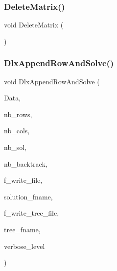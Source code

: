 \mbox{\label{_l_i_b_2_g_a_l_o_i_s_2dlx_8_c_a0d0d8367563593a49ea746e787a1a38a}} 
\subsubsection{\texorpdfstring{Delete\+Matrix()}{DeleteMatrix()}}
{\footnotesize\ttfamily void Delete\+Matrix (\begin{DoxyParamCaption}{ }\end{DoxyParamCaption})}

\mbox{\label{_l_i_b_2_g_a_l_o_i_s_2dlx_8_c_a97c7622b60d10dfea1a968ef4252e0d8}} 
\subsubsection{\texorpdfstring{Dlx\+Append\+Row\+And\+Solve()}{DlxAppendRowAndSolve()}}
{\footnotesize\ttfamily void Dlx\+Append\+Row\+And\+Solve (\begin{DoxyParamCaption}\item[{\mbox{\hyperlink{galois_8h_a09fddde158a3a20bd2dcadb609de11dc}{I\+NT}} $\ast$}]{Data,  }\item[{\mbox{\hyperlink{galois_8h_a09fddde158a3a20bd2dcadb609de11dc}{I\+NT}}}]{nb\+\_\+rows,  }\item[{\mbox{\hyperlink{galois_8h_a09fddde158a3a20bd2dcadb609de11dc}{I\+NT}}}]{nb\+\_\+cols,  }\item[{\mbox{\hyperlink{galois_8h_a09fddde158a3a20bd2dcadb609de11dc}{I\+NT}} \&}]{nb\+\_\+sol,  }\item[{\mbox{\hyperlink{galois_8h_a09fddde158a3a20bd2dcadb609de11dc}{I\+NT}} \&}]{nb\+\_\+backtrack,  }\item[{\mbox{\hyperlink{galois_8h_a09fddde158a3a20bd2dcadb609de11dc}{I\+NT}}}]{f\+\_\+write\+\_\+file,  }\item[{const \mbox{\hyperlink{galois_8h_ab6cc7b4aeb6ea31aba2b3fbfc83ff5e6}{B\+Y\+TE}} $\ast$}]{solution\+\_\+fname,  }\item[{\mbox{\hyperlink{galois_8h_a09fddde158a3a20bd2dcadb609de11dc}{I\+NT}}}]{f\+\_\+write\+\_\+tree\+\_\+file,  }\item[{const \mbox{\hyperlink{galois_8h_ab6cc7b4aeb6ea31aba2b3fbfc83ff5e6}{B\+Y\+TE}} $\ast$}]{tree\+\_\+fname,  }\item[{\mbox{\hyperlink{galois_8h_a09fddde158a3a20bd2dcadb609de11dc}{I\+NT}}}]{verbose\+\_\+level }\end{DoxyParamCaption})}

